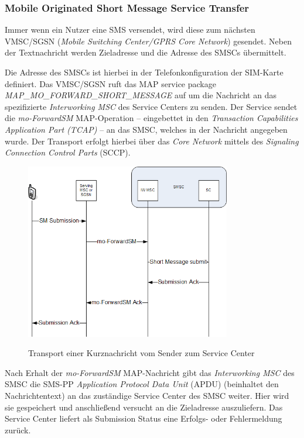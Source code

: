 \documentclass[german,12pt,a4paper]{article}
\begin{document}
\subsubsection{Mobile Originated Short Message Service Transfer}
Immer wenn ein Nutzer eine SMS versendet, wird diese zum nächsten VMSC/SGSN (\textit{Mobile Switching 
Center/GPRS Core Network}) gesendet. Neben der Textnachricht werden Zieladresse und die Adresse des 
SMSCs übermittelt. 

Die Adresse des SMSCs ist hierbei in der Telefonkonfiguration der SIM-Karte definiert. Das VMSC/SGSN 
ruft das MAP service package \textit{MAP\_MO\_FORWARD\_SHORT\_\-MESSAGE} auf um die Nachricht an das spezifizierte 
\textit{Interworking MSC} des Service Centers zu senden. Der Service sendet die \textit{mo-ForwardSM} MAP-Operation --
eingebettet in den \textit{Transaction Capabilities Application Part (TCAP)} -- an das SMSC, welches in der 
Nachricht angegeben wurde. Der Transport erfolgt hierbei über das \textit{Core Network} mittels des \textit{Signaling 
Connection Control Parts} (SCCP).

\begin{figure}[htm]
    \centering
	\includegraphics[width=0.8\textwidth]{img/mo-forward-sm.png}
    \label{fig:mo-forward-sm}
    \caption{Transport einer Kurznachricht vom Sender zum Service Center}
\end{figure}	

Nach Erhalt der \textit{mo-ForwardSM} MAP-Nachricht gibt das \textit{Interworking MSC} des SMSC die SMS-PP \textit{Application 
Protocol Data Unit} (APDU) (beinhaltet den Nachrichtentext) an das zuständige Service Center des SMSC 
weiter. Hier wird sie gespeichert und anschließend versucht an die Zieladresse auszuliefern. Das 
Service Center liefert als Submission Status eine Erfolgs- oder Fehlermeldung zurück.
\end{document}
